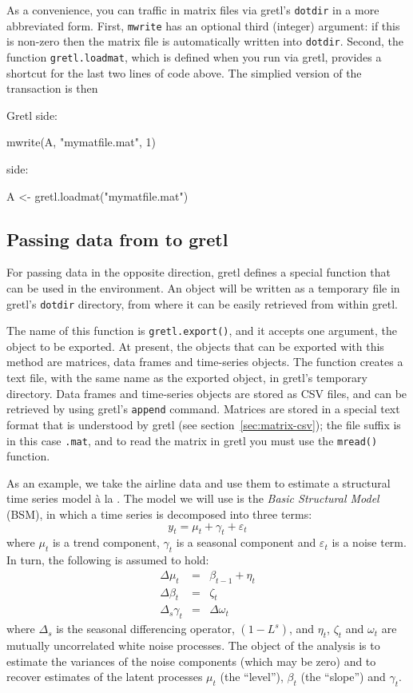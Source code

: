 As a convenience, you can traffic in matrix files via gretl's
\texttt{dotdir} in a more abbreviated form. First, \texttt{mwrite} has
an optional third (integer) argument: if this is non-zero then the
matrix file is automatically written into \texttt{dotdir}.  Second,
the function \texttt{gretl.loadmat}, which is defined when you run
 via gretl, provides a shortcut for the last two lines of
 code above. The simplied version of the transaction is then

Gretl side:
\begin{code}
  mwrite(A, "mymatfile.mat", 1)
\end{code}
 side:
\begin{code}
  A <- gretl.loadmat("mymatfile.mat")
\end{code}

\subsection{Passing data from  to gretl}
\label{sec:Rpassing-data}

For passing data in the opposite direction, gretl defines a
special function that can be used in the  environment. An
 object will be written as a temporary file in gretl's
\texttt{dotdir} directory, from where it can be easily retrieved from
within gretl.

The name of this function is \texttt{gretl.export()}, and it accepts
one argument, the object to be exported. At present, the objects that
can be exported with this method are matrices, data frames and
time-series objects. The function creates a text file, with the same
name as the exported object, in gretl's temporary
directory. Data frames and time-series objects are stored as CSV
files, and can be retrieved by using gretl's \texttt{append}
command.  Matrices are stored in a special text format that is
understood by gretl (see section~\ref{sec:matrix-csv}); the file
suffix is in this case \texttt{.mat}, and to read the matrix in
gretl you must use the \texttt{mread()} function.

As an example, we take the airline data and use them to estimate a
structural time series model \`a la \cite{harvey89}. The model we will 
use is the \emph{Basic Structural Model} (BSM), in which a time series
is decomposed into three terms:
\[
  y_t = \mu_t + \gamma_t + \varepsilon_t
\]
where $\mu_t$ is a trend component, $\gamma_t$ is a seasonal component
and $\varepsilon_t$ is a noise term. In turn, the following is assumed
to hold:
\begin{eqnarray*}
  \Delta \mu_t & = & \beta_{t-1} + \eta_t \\
  \Delta \beta_t & = & \zeta_t \\
  \Delta_s \gamma_t & = & \Delta \omega_t
\end{eqnarray*}
where $\Delta_s$ is the seasonal differencing operator, $(1-L^s)$, and
$\eta_t$, $\zeta_t$ and $\omega_t$ are mutually uncorrelated white
noise processes. The object of the analysis is to estimate the
variances of the noise components (which may be zero) and to recover
estimates of the latent processes $\mu_t$ (the ``level''), $\beta_t$
(the ``slope'') and $\gamma_t$.

